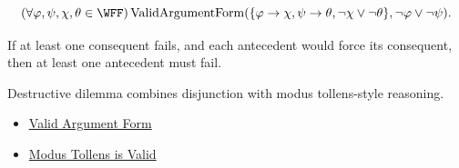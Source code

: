 \begin{remark*}
\[
(\forall\varphi,\psi,\chi,\theta\in\WFF)
\operatorname{ValidArgumentForm}(\{\varphi\to\chi,\psi\to\theta,\neg\chi\lor\neg\theta\},\neg\varphi\lor\neg\psi).
\]
\end{remark*}

\begin{remark*}
If at least one consequent fails, and each antecedent would force its
consequent, then at least one antecedent must fail.
\end{remark*}

\begin{remark*}[Interpretation]
Destructive dilemma combines disjunction with modus tollens-style reasoning.
\end{remark*}

\begin{dependencies}
\begin{itemize}
  \item \hyperref[def:valid-argument-form-propositional-logic]{Valid Argument Form}
  \item \hyperref[thm:modus-tollens-validity-propositional-logic]{Modus Tollens is Valid}
\end{itemize}
\end{dependencies}
